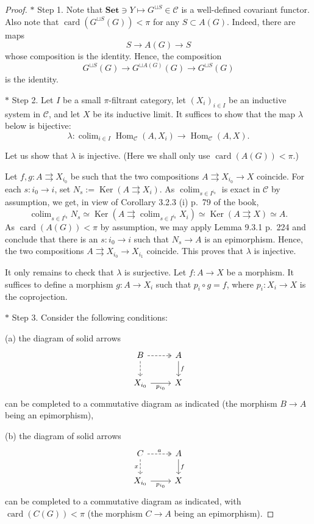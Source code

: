\documentclass[12pt]{article}%
\theoremstyle{remark}
\theoremstyle{definition}
\newcommand{\nn}{\noindent}
\newcommand{\C}{\mathcal C}
\newcommand{\Set}{\mathbf{Set}}
\newcommand{\parar}{\rightrightarrows}
\DeclareMathOperator*{\colim}{colim}
\DeclareMathOperator{\card}{card}%
\DeclareMathOperator{\Hom}{Hom}%
\DeclareMathOperator{\Ker}{Ker}
\begin{document}
\begin{proof}
$*$ Step 1. Note that $\Set\ni Y\mapsto G^{\sqcup S}\in\C$ is a well-defined covariant functor. Also note that $\card(G^{\sqcup S}(G))<\pi$ for any $S\subset A(G)$. Indeed, there are maps 
$$S\to A(G)\to S$$ 
whose composition is the identity. Hence, the composition 
$$G^{\sqcup S}(G)\to G^{\sqcup A(G)}(G)\to G^{\sqcup S}(G)$$ 
is the identity.

\nn $*$ Step 2. Let $I$ be a small $\pi$-filtrant category, let $(X_i)_{i\in I}$ be an inductive system in $\C$, and let $X$ be its inductive limit. It suffices to show that the map $\lambda$ below is bijective: 
$$
\lambda:\colim_{i\in I}\Hom_\C(A,X_i)\to\Hom_\C(A,X).
$$

Let us show that $\lambda$ is injective. (Here we shall only use $\card(A(G))<\pi$.)

Let $f,g:A\parar X_{i_0}$ be such that the two compositions $A\parar X_{i_0}\to X$ coincide. For each $s:i_0\to i$, set $N_s:=\Ker(A\parar X_i)$. As $\colim_{s\in I^{i_0}}$ is exact in $\C$ by assumption, we get, in view of Corollary 3.2.3 (i) p.~79 of the book, 
$$
\colim_{s\in I^{i_0}}N_s\simeq\Ker\left(A\parar\colim_{s\in I^{i_0}}X_i\right)\simeq\Ker(A\parar X)\simeq A.
$$ 
As $\card(A(G))<\pi$ by assumption, we may apply Lemma 9.3.1 p.~224 and conclude that there is an $s:i_0\to i$ such that $N_s\to A$ is an epimorphism. Hence, the two compositions $A\parar X_{i_0}\to X_{i_1}$ coincide. This proves that $\lambda$ is injective. 

It only remains to check that $\lambda$ is surjective. Let $f:A\to X$ be a morphism. It suffices to define a morphism $g:A\to X_i$ such that $p_i\circ g=f$, where $p_i:X_i\to X$ is the coprojection. 

\nn $*$ Step 3. Consider the following conditions:

\nn(a) the diagram of solid arrows 
$$
\begin{tikzcd}
B\ar[dashed,two heads]{r}\ar[dashed]{d}&A\ar{d}{f}\\ 
X_{i_0}\ar{r}[swap]{p_{i_0}}&X
\end{tikzcd}
$$
can be completed to a commutative diagram as indicated (the morphism $B\to A$ being an epimorphism),

\nn(b) the diagram of solid arrows 
%
\begin{equation}\label{fa}
\begin{tikzcd}
C\ar[dashed,two heads]{r}{a}\ar[dashed]{d}[swap]{x}&A\ar{d}{f}\\ 
X_{i_0}\ar{r}[swap]{p_{i_0}}&X
\end{tikzcd}
\end{equation}
%
can be completed to a commutative diagram as indicated, with $\card(C(G))<\pi$ (the morphism $C\to A$ being an epimorphism).


\end{proof}
\end{document}
